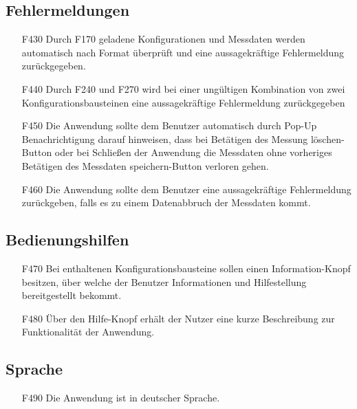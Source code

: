 \documentclass[parskip=full]{scrartcl}
\begin{document}
\subsection{Fehlermeldungen}

\begin{itemize}
\item[F430] Durch F170 geladene Konfigurationen und Messdaten werden automatisch nach Format überprüft und eine aussagekräftige Fehlermeldung zurückgegeben.
\item[F440] Durch F240 und F270 wird bei einer ungültigen Kombination von zwei Konfigurationsbausteinen eine aussagekräftige Fehlermeldung zurückgegeben
\item[F450] Die Anwendung sollte dem Benutzer automatisch durch Pop-Up Benachrichtigung darauf hinweisen, dass bei Betätigen des Messung löschen-Button oder bei Schließen der Anwendung die Messdaten ohne vorheriges Betätigen des Messdaten speichern-Button verloren gehen.
\item[F460] Die Anwendung sollte dem Benutzer eine aussagekräftige Fehlermeldung zurückgeben, falls es zu einem Datenabbruch der Messdaten kommt.

\end{itemize}



\subsection{Bedienungshilfen}

\begin{itemize}

\item[F470] Bei enthaltenen Konfigurationsbausteine sollen einen Information-Knopf besitzen, über welche der Benutzer Informationen und Hilfestellung bereitgestellt bekommt.
\item[F480] Über den Hilfe-Knopf erhält der Nutzer eine kurze Beschreibung zur Funktionalität der Anwendung.

\end{itemize}

\subsection{Sprache}

\begin{itemize}

\item[F490] Die Anwendung ist in deutscher Sprache.

\end{itemize}
\end{document}
